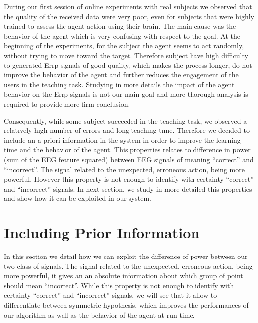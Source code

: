 During our first session of online experiments with real subjects we observed that the quality of the received data were very poor, even for subjects that were highly trained to assess the agent action using their brain. The main cause was the behavior of the agent which is very confusing with respect to the goal. At the beginning of the experiments, for the subject the agent seems to act randomly, without trying to move toward the target. Therefore subject have high difficulty to generated Errp signals of good quality, which makes the process longer, do not improve the behavior of the agent and further reduces the engagement of the users in the teaching task. Studying in more details the impact of the agent behavior on the Errp signals is not our main goal and more thorough analysis is required to provide more firm conclusion.

Consequently, while some subject succeeded in the teaching task, we observed a relatively high number of errors and long teaching time. Therefore we decided to include an a priori information in the system in order to improve the learning time and the behavior of the agent. This properties relates to difference in power (sum of the EEG feature squared) between EEG signals of meaning ``correct'' and ``incorrect''. The signal related to the unexpected, erroneous action, being more powerful. However this property is not enough to identify with certainty ``correct'' and ``incorrect'' signals. In next section, we study in more detailed this properties and show how it can be exploited in our system.

\section{Including Prior Information}
\label{chapter:bci:priorpower}

In this section we detail how we can exploit the difference of power between our two class of signals. The signal related to the unexpected, erroneous action, being more powerful, it gives an an absolute information about which group of point should mean ``incorrect''. While this property is not enough to identify with certainty ``correct'' and ``incorrect'' signals, we will see that it allow to differentiate between symmetric hypothesis, which improves the performances of our algorithm as well as the behavior of the agent at run time.

